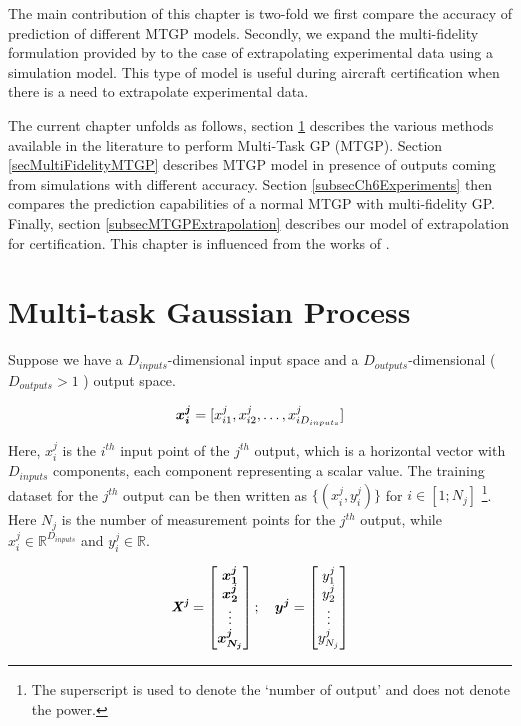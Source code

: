 The main contribution of this chapter is two-fold we first compare the accuracy of prediction of different MTGP models. Secondly, we expand the multi-fidelity formulation provided by \cite{kennedy2000predicting} to the case of extrapolating experimental data using a simulation model. This type of model is useful during aircraft certification when there is a need to extrapolate experimental data.   

The current chapter unfolds as follows, section \ref{secMTGP} describes the various methods available in the literature to perform Multi-Task GP (MTGP). Section \ref{secMultiFidelityMTGP} describes MTGP model in presence of outputs coming from simulations with different accuracy. Section \ref{subsecCh6Experiments} then compares the prediction capabilities of a normal MTGP with multi-fidelity GP. Finally, section \ref{subsecMTGPExtrapolation} describes our model of extrapolation for certification. This chapter is influenced from the works of \cite{forrester2007multi, alvarez2011kernels, bonilla_multi-task_2008, Boyle05dependentgaussian, kennedy2000predicting, le2013multi}.

\section{Multi-task Gaussian Process}\label{secMTGP}
Suppose we have a \(D_{inputs}\)-dimensional input space and a \(D_{outputs}\)-dimensional (\(D_{outputs} > 1\) )  output space. 

\begin{equation}\label{eqInitialInputPoint}
        \boldsymbol{x_{i}^{j}} = [x_{i1}^{j}, x_{i2}^{j}, \ldots, x_{iD_{inputs}}^{j}]
\end{equation}

Here, $x_{i}^{j}$ is the $i^{th}$ input point of the $j^{th}$ output, which is a horizontal vector with $D_{inputs}$ components, each component representing a scalar value. The training dataset for the \(j^{th}\) output can be then written as \(\{(x_{i}^{j}, y_{i}^{j})\}\) for \(i \in [1; N_{j}]\) \footnote{The superscript is used to denote the `number of output' and does not denote the power.}. Here \(N_{j}\) is the number of measurement points for the \(j^{th}\) output, while \(x_{i}^{j} \in \mathbb{R}^{D_{inputs}}\) and \(y_{i}^{j} \in \mathbb{R}\). 

\begin{equation}
        \bm{\mathit{X^j}} = \begin{bmatrix}
\boldsymbol{x_1^j}\\ 
\boldsymbol{x_2^j}\\ 
\vdots\\ 
\boldsymbol{x_{N_j}^j}
\end{bmatrix} ; \quad 
\boldsymbol{y^j} = \begin{bmatrix}
y_1^j\\ 
y_2^j\\ 
\vdots\\ 
y_{N_j}^j
\end{bmatrix}
\end{equation}

